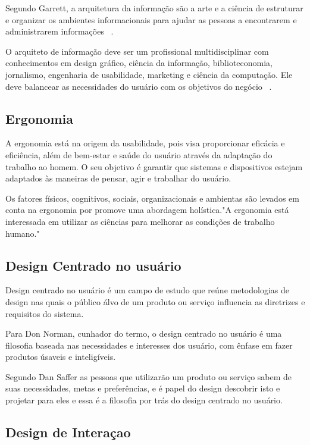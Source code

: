 Segundo Garrett, a arquitetura da informação são a arte e a ciência de estruturar e organizar os ambientes informacionais para ajudar as pessoas a encontrarem e administrarem informações ~\cite{garret2003}.

O arquiteto de informação deve ser um profissional multidisciplinar com conhecimentos em design gráfico, ciência da informação, biblioteconomia, jornalismo, engenharia de usabilidade, marketing e ciência da computação. Ele deve balancear as necessidades do usuário com os objetivos do negócio ~\cite{rosenfeld1998}.

\subsection{Ergonomia}

A ergonomia está na origem da usabilidade, pois visa proporcionar eficácia e eficiência, além de bem-estar e saúde do usuário através da adaptação do trabalho ao homem. O seu objetivo é garantir que sistemas e dispositivos estejam adaptados às maneiras de pensar, agir e trabalhar do usuário. ~\cite{cybis2010}

	Os fatores físicos, cognitivos, sociais, organizacionais e ambientas são levados em conta na ergonomia por promove uma abordagem holística."A ergonomia está interessada em utilizar as ciências para melhorar as condições de trabalho humano."    

\subsection{Design Centrado no usuário}

	Design centrado no usuário é um campo de estudo que reúne metodologias de design nas quais o público álvo de um produto ou serviço influencia as diretrizes e requisitos do sistema. %
	
	Para Don Norman, cunhador do termo, o design centrado no usuário é uma filosofia baseada nas necessidades e interesses dos usuário, com ênfase em fazer produtos úsaveis e inteligíveis.

	Segundo Dan Saffer as pessoas que utilizarão um produto ou serviço sabem de suas necessidades, metas e preferências, e é papel do design descobrir isto e projetar para eles e essa é a filosofia por trás do design centrado no usuário.
	
\subsection{Design de Interaçao}

